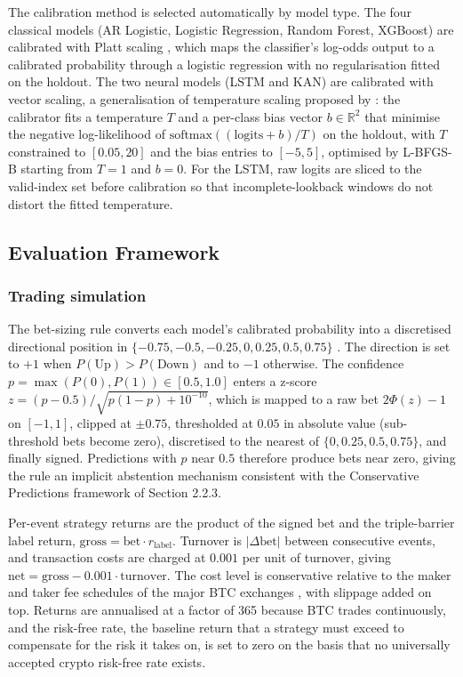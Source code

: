The calibration method is selected automatically by model type. The four classical models (AR Logistic, Logistic Regression, Random Forest, XGBoost) are calibrated with Platt scaling \citep{platt_1999}, which maps the classifier's log-odds output to a calibrated probability through a logistic regression with no regularisation fitted on the holdout. The two neural models (LSTM and KAN) are calibrated with vector scaling, a generalisation of temperature scaling proposed by \citet[Section 4.2]{guo_temperature_2017}: the calibrator fits a temperature $T$ and a per-class bias vector $b \in \mathbb{R}^{2}$ that minimise the negative log-likelihood of $\text{softmax}((\text{logits} + b) / T)$ on the holdout, with $T$ constrained to $[0.05, 20]$ and the bias entries to $[-5, 5]$, optimised by L-BFGS-B starting from $T = 1$ and $b = 0$. For the LSTM, raw logits are sliced to the valid-index set before calibration so that incomplete-lookback windows do not distort the fitted temperature.


\subsection{Evaluation Framework}\label{subsec:evaluation}


\subsubsection{Trading simulation}\label{subsubsec:trading_simulation}

The bet-sizing rule converts each model's calibrated probability into a discretised directional position in $\{-0.75, -0.5, -0.25, 0, 0.25, 0.5, 0.75\}$ \citep[Chapter 10]{lopez_de_prado_2018}. The direction is set to $+1$ when $P(\text{Up}) > P(\text{Down})$ and to $-1$ otherwise. The confidence $p = \max(P(0), P(1)) \in [0.5, 1.0]$ enters a z-score $z = (p - 0.5) / \sqrt{p(1 - p) + 10^{-10}}$, which is mapped to a raw bet $2\Phi(z) - 1$ on $[-1, 1]$, clipped at $\pm 0.75$, thresholded at $0.05$ in absolute value (sub-threshold bets become zero), discretised to the nearest of $\{0, 0.25, 0.5, 0.75\}$, and finally signed. Predictions with $p$ near $0.5$ therefore produce bets near zero, giving the rule an implicit abstention mechanism consistent with the Conservative Predictions framework of Section 2.2.3.

Per-event strategy returns are the product of the signed bet and the triple-barrier label return, $\text{gross} = \text{bet} \cdot r_{\text{label}}$. Turnover is $|\Delta \text{bet}|$ between consecutive events, and transaction costs are charged at $0.001$ per unit of turnover, giving $\text{net} = \text{gross} - 0.001 \cdot \text{turnover}$. The cost level is conservative relative to the maker and taker fee schedules of the major BTC exchanges \citep{nabar_shroff_2023}, with slippage added on top. Returns are annualised at a factor of 365 because BTC trades continuously, and the risk-free rate, the baseline return that a strategy must exceed to compensate for the risk it takes on, is set to zero on the basis that no universally accepted crypto risk-free rate exists.

